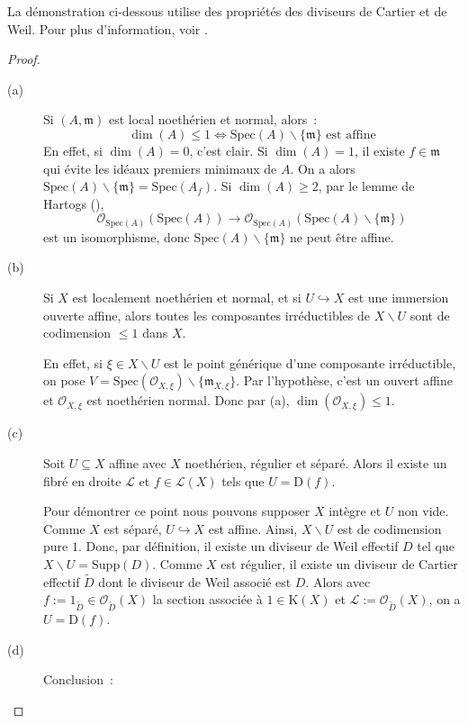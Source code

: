 \documentclass{amsart}
\theoremstyle{plain}
\theoremstyle{definition}
\theoremstyle{remark}
\newcommand{\Ring}[1]{\mathcal{O}_{#1}}
\newcommand{\Supp}[1]{\mathrm{Supp}({#1})}
\newcommand{\ra}{\rightarrow}
\newcommand{\Spec}[1]{\mathrm{Spec}({#1})}
\newcommand{\Open}[1]{\mathrm{D}({#1})}
\begin{document}
La démonstration ci-dessous utilise des propriétés des diviseurs de Cartier et de Weil. Pour plus d'information, voir \cite[chp. 11]{Gort}.

\begin{proof}
  \begin{description}
    \item[(a)] Si $(A,\mathfrak{m})$ est local noethérien et normal, alors~:
    $$\dim(A)\leq 1 \Leftrightarrow \Spec{A}\backslash \{\mathfrak{m}\}\text{ est affine}$$
    En effet, si $\dim(A)=0$, c'est clair. Si $\dim(A)=1$, il existe $f\in \mathfrak{m}$ qui évite les idéaux premiers minimaux de $A$.
    On a alors $\Spec{A}\backslash \{\mathfrak{m}\}=\Spec{A_f}$. Si $\dim(A)\geq 2$, par le lemme de Hartogs (\cite[6.45]{Gort}),
    $$\Ring{\Spec{A}}(\Spec{A})\ra \Ring{\Spec{A}}(\Spec{A}\backslash \{\mathfrak{m}\})$$
    est un isomorphisme, donc $\Spec{A}\backslash \{\mathfrak{m}\}$ ne peut être affine.
    
    \item[(b)] Si $X$ est localement noethérien et normal, et si $U\hookrightarrow X$ est une immersion ouverte affine, alors toutes les composantes
    irréductibles de $X\backslash U$ sont de codimension $\leq 1$ dans $X$.
    
    En effet, si $\xi\in X\backslash U$ est le point générique d'une composante irréductible, on pose 
    $V=\Spec{\Ring{X,\xi}}\backslash\{\mathfrak{m}_{X,\xi}\}$. Par l'hypothèse, c'est un ouvert affine et $\Ring{X,\xi}$ est noethérien normal.
    Donc par (a), $\dim(\Ring{X,\xi})\leq 1$.
    
    \item[(c)] Soit $U\subseteq X$ affine avec $X$ noethérien, régulier et séparé. Alors il existe un fibré en droite $\mathcal{L}$ et $f\in \mathcal{L}(X)$
    tels que $U=\Open{f}$.
    
    Pour démontrer ce point nous pouvons supposer $X$ intègre et $U$ non vide. Comme $X$ est séparé, $U\hookrightarrow X$ est affine.
    Ainsi, $X\backslash U$ est de codimension pure $1$. Donc, par définition, il existe un diviseur de Weil effectif $D$ tel que
    $X\backslash U=\Supp{D}$. Comme $X$ est régulier, il existe un diviseur de Cartier effectif $\tilde{D}$ dont le diviseur
    de Weil associé est $D$. Alors avec $f:=1_{\tilde{D}}\in \Ring{\tilde{D}}(X)$ la section associée à $1\in\mathrm{K}(X)$ et 
    $\mathcal{L}:=\Ring{\tilde{D}}(X)$, on a $U=\Open{f}$.

    \item[(d)] Conclusion~:


\end{description}
\end{proof}
\end{document}
